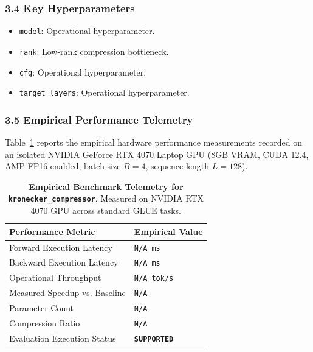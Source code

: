 \subsubsection*{3.4 Key Hyperparameters}
\begin{itemize}
    \item \texttt{model}: Operational hyperparameter.
    \item \texttt{rank}: Low-rank compression bottleneck.
    \item \texttt{cfg}: Operational hyperparameter.
    \item \texttt{target\_layers}: Operational hyperparameter.
\end{itemize}

\subsubsection*{3.5 Empirical Performance Telemetry}
Table~\ref{tab:telemetry_kronecker\_compressor} reports the empirical hardware performance measurements recorded on an isolated NVIDIA GeForce RTX 4070 Laptop GPU (8GB VRAM, CUDA 12.4, AMP FP16 enabled, batch size $B=4$, sequence length $L=128$).

\begin{table}[h]
\centering
\small
\caption{\textbf{Empirical Benchmark Telemetry for \texttt{kronecker\_compressor}}. Measured on NVIDIA RTX 4070 GPU across standard GLUE tasks.}
\label{tab:telemetry_kronecker\_compressor}
\begin{tabularx}{\columnwidth}{lX}
\toprule
\textbf{Performance Metric} & \textbf{Empirical Value} \\
\midrule
Forward Execution Latency & \texttt{N/A ms} \\
Backward Execution Latency & \texttt{N/A ms} \\
Operational Throughput & \texttt{N/A tok/s} \\
Measured Speedup vs. Baseline & \texttt{N/A} \\
Parameter Count & \texttt{N/A} \\
Compression Ratio & \texttt{N/A} \\
Evaluation Execution Status & \textbf{\texttt{SUPPORTED}} \\
\bottomrule
\end{tabularx}
\end{table}

